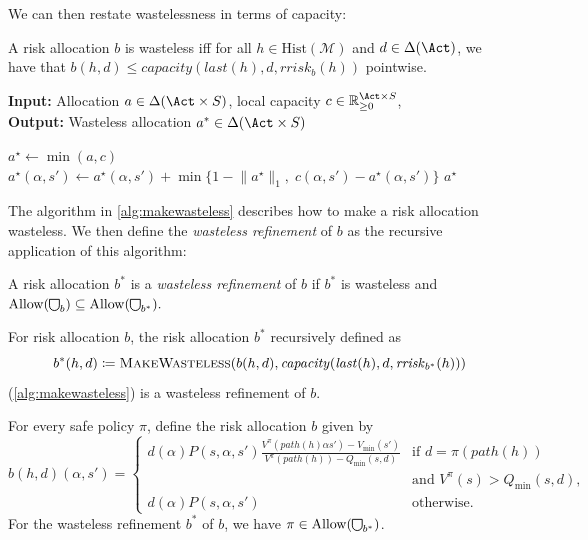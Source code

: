 \documentclass[runningheads]{llncs}
\newcommand{\M}{\mathcal{M}}
\newcommand{\Distr}{\Delta}
\newcommand{\Hist}{\mathrm{Hist}}
\newcommand{\Allow}{\mathrm{Allow}}
\newcommand\shieldbase{%
  \tikz[baseline=0.2ex] \draw[semithick]
    (0,1.75ex) -- (0,0.75ex)
    arc [radius=0.75ex, start angle=-180, end angle=0]
    -- (1.5ex,1.75ex) -- cycle;%
}
\DeclareRobustCommand\shield{%
  \mathord{\scalerel*{\shieldbase}{\bigcirc}}%
}
\newcommand{\capacity}{\mathit{capacity}}
\newcommand{\rrisk}{\mathit{rrisk}}
\newcommand{\hpath}{\mathit{path}}
\newcommand{\last}{\mathit{last}}
\begin{document}
We can then restate wastelessness in terms of capacity:

\begin{lemma}
    A risk allocation \(b\) is wasteless iff for all \(h \in \Hist(\M)\) and \(d \in \Distr(\Act)\), we have that \(b(h,d) \leq \capacity(\last(h),d, \rrisk_b(h))\) pointwise.
\end{lemma}

\begin{algorithm}[t]
    \caption{Make an allocation wasteless}
    \label{alg:makewasteless}
    \textbf{Input:} Allocation \(a \in \Distr(\Act \times S)\), local capacity \(c \in \mathbb{R}_{\geq 0}^{\Act \times S}\),  \\
    \textbf{Output:} Wasteless allocation \(a^* \in \Distr(\Act \times S)\)
    \begin{algorithmic}
    \State \(a^\star \gets \min(a, c)\) 
        \State \(a^\star(\alpha,s') \gets a^\star(\alpha,s')+ \min\{1-\lVert a^\star\rVert_1,\; c(\alpha,s')-a^\star(\alpha,s') \}\)
    \EndFor
    \State \Return \(a^\star\)
    \EndFunction
    \end{algorithmic}
\end{algorithm}

The algorithm in \cref{alg:makewasteless} describes how to make a risk allocation wasteless. We then define the \emph{wasteless refinement} of \(b\) as the recursive application of this algorithm:

\begin{definition}
    A risk allocation \(b^*\) is a \emph{wasteless refinement} of \(b\)
    if \(b^*\) is wasteless and
    \(
        \Allow(\shield_b) \subseteq \Allow(\shield_{b^*}).
    \)
\end{definition}

\begin{theorem}
    \label{thm:wasteless}
    For risk allocation \(b\), the risk allocation \(b^*\) recursively defined as \[
        b^*(h,d) \coloneq \textsc{MakeWasteless}(b(h,d), \capacity(\last(h), d, \rrisk_{b^*}(h)))
    \] (\cref{alg:makewasteless}) is a wasteless refinement of \(b\).
\end{theorem}

\begin{theorem}
    \label{thm:allowablepolicy}
    For every safe policy \(\pi\), define the risk allocation \(b\) given by
    \[
        b(h,d)(\alpha,s') = \begin{cases}
            d(\alpha) P(s,\alpha,s') \frac{V^\pi(\hpath(h) \alpha s') - V_{\min}(s')}{V^\pi(\hpath(h)) - Q_{\min}(s,d)} &\text{if } d = \pi(\hpath(h)) \\ &\text{and } V^\pi(s) > Q_{\min}(s,d), \\
            d(\alpha) P(s,\alpha,s') &\text{otherwise.}
        \end{cases}
    \]
    For the wasteless refinement \(b^*\) of \(b\), we have \(\pi \in \Allow(\shield_{b^*})\).%
\end{theorem}
\end{document}
